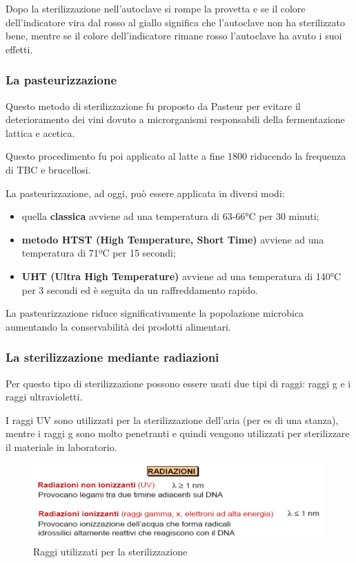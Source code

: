 \documentclass[11pt]{book}
\begin{document}
Dopo la sterilizzazione nell’autoclave si rompe la provetta e se il colore dell'indicatore vira dal rosso al giallo significa che l’autoclave non ha sterilizzato bene, mentre se il colore dell'indicatore rimane rosso l’autoclave ha avuto i suoi effetti.


\subsubsection{La pasteurizzazione} 
Questo metodo di sterilizzazione fu proposto da Pasteur per evitare il deterioramento dei vini dovuto a microrganismi responsabili della fermentazione lattica e acetica. 

Questo procedimento fu poi applicato al latte a fine 1800 riducendo la frequenza di TBC e brucellosi.

La pasteurizzazione, ad oggi, può essere applicata in diversi modi:
\begin{itemize}
\item quella \textbf{classica} avviene ad una temperatura di 63-66°C per 30 minuti;
\item \textbf{metodo HTST (High Temperature, Short Time)} avviene ad una temperatura di 71ºC per 15 secondi;
\item \textbf{UHT (Ultra High Temperature)} avviene ad una temperatura di 140°C per 3 secondi ed è seguita da un raffreddamento rapido.
\end{itemize}

La pasteurizzazione riduce significativamente la popolazione microbica aumentando la conservabilità dei prodotti alimentari.

\subsubsection{La sterilizzazione mediante radiazioni}
Per questo tipo di sterilizzazione possono essere usati due tipi di raggi: raggi g e i raggi ultravioletti. 

I raggi UV sono utilizzati per la sterilizzazione dell'aria (per es di una stanza), mentre i raggi g sono molto penetranti e quindi vengono utilizzati per sterilizzare il materiale in laboratorio.

\begin{figure}[htp]
\centering
\includegraphics[scale=0.5]{img/Sterilizzazione tramite radiazioni.png}
\caption{Raggi utilizzati per la sterilizzazione}
\label{}
\end{figure}
\end{document}
